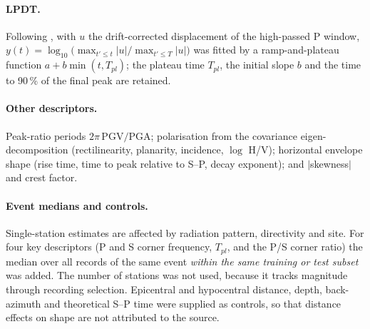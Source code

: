 \documentclass[11pt,a4paper]{article}
\begin{document}
\paragraph{LPDT.} Following \citet{colombelli2015}, with $u$ the
drift-corrected displacement of the high-passed P window,
$y(t) = \log_{10}\big(\max_{t'\le t}|u| / \max_{t'\le T}|u|\big)$ was fitted by a
ramp-and-plateau function $a + b\min(t, T_{pl})$; the plateau time $T_{pl}$, the
initial slope $b$ and the time to 90\,\% of the final peak are retained.

\paragraph{Other descriptors.} Peak-ratio periods $2\pi\,\mathrm{PGV}/\mathrm{PGA}$;
polarisation from the covariance eigen-decomposition (rectilinearity,
planarity, incidence, $\log$ H/V); horizontal envelope shape (rise time, time
to peak relative to S--P, decay exponent); and $|$skewness$|$ and crest factor.

\paragraph{Event medians and controls.} Single-station estimates are affected by
radiation pattern, directivity and site. For four key descriptors
(P and S corner frequency, $T_{pl}$, and the P/S corner ratio) the median over
all records of the same event \emph{within the same training or test subset}
was added. The number of stations was not used, because it tracks magnitude
through recording selection. Epicentral and hypocentral distance, depth,
back-azimuth and theoretical S--P time were supplied as controls, so that
distance effects on shape are not attributed to the source.
\end{document}
